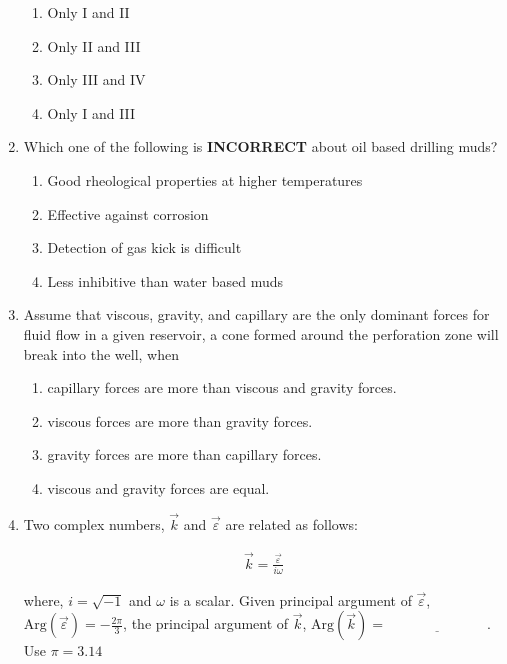 \documentclass[journal,12pt,onecolumn]{IEEEtran}
\theoremstyle{remark}
\begin{document}
\begin{enumerate}
\begin{enumerate}
\item Only I and II
\item Only II and III
\item Only III and IV
\item Only I and III
\end{enumerate}

\item  Which one of the following is \textbf{INCORRECT} about oil based drilling muds?

\hfill{}

\begin{enumerate}
\item Good rheological properties at higher temperatures 
\item Effective against corrosion
\item Detection of gas kick is difficult
\item Less inhibitive than water based muds
\end{enumerate}

\item Assume that viscous, gravity, and capillary are the only dominant forces for fluid flow in a given reservoir, a cone formed around the perforation zone will break into the well, when

\hfill{}

\begin{enumerate}
\item capillary forces are more than viscous and gravity forces.
\item viscous forces are more than gravity forces.
\item gravity forces are more than capillary forces.
\item viscous and gravity forces are equal.
\end{enumerate}

\pagebreak

\item Two complex numbers, $\vec{k}$ and $\vec{\varepsilon}$ are related as follows:

\hfill{}

\begin{align*}
\vec{k} = \frac{\vec{\varepsilon}}{i\omega}
\end{align*}

where, $i = \sqrt{-1}$ and $\omega$ is a scalar. Given principal argument of $\vec{\varepsilon}$, $\text{Arg}(\vec{\varepsilon}) = -\frac{2\pi}{3}$, the principal argument of $\vec{k}$, $\text{Arg}(\vec{k}) = \underline{\hspace{3cm}}$.  \\
Use $\pi = 3.14$


\end{enumerate}
\end{document}
